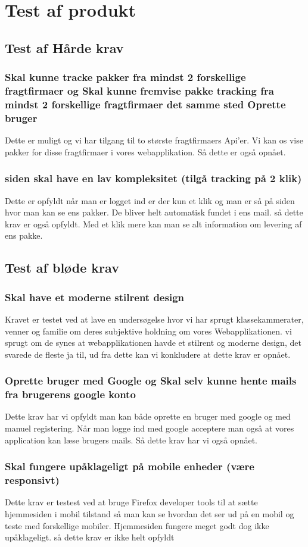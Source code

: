 \chapter{Test af produkt}
\section{Test af Hårde krav}
\subsection*{Skal kunne tracke pakker fra mindst 2 forskellige fragtfirmaer og Skal kunne fremvise pakke tracking fra mindst 2 forskellige fragtfirmaer det samme sted Oprette
bruger}
Dette er muligt og vi har tilgang til to største fragtfirmaers Api'er. Vi kan os vise pakker for disse fragtfirmaer i vores webapplikation. Så dette er også
opnået.
\subsection*{siden skal have en lav kompleksitet (tilgå tracking på 2 klik)}
Dette er opfyldt når man er logget ind er der kun et klik og man er så på siden hvor man kan se 
ens pakker. De bliver helt automatisk fundet i ens mail. så dette krav er også opfyldt. Med et klik mere kan man
se alt information om levering af ens pakke.

\section{Test af bløde krav}
\subsection*{Skal have et moderne stilrent design}
Kravet er testet ved at lave en undersøgelse hvor vi har sprugt klassekammerater, venner og familie om deres
subjektive holdning om vores Webapplikationen. vi sprugt om de synes at webapplikationen havde et stilrent og moderne design,
det svarede de fleste ja til, ud fra dette kan vi konkludere at dette krav er opnået.

\subsection*{Oprette bruger med Google og Skal selv kunne hente mails fra brugerens google konto}

Dette krav har vi opfyldt man kan både oprette en bruger med google og med manuel registering. Når man
logge ind med google acceptere man også at vores application kan læse brugers mails. Så dette krav har vi også opnået. 

\subsection*{Skal fungere upåklageligt på mobile enheder (være responsivt)}

Dette krav er testest ved at bruge Firefox developer tools til at sætte hjemmesiden i mobil 
tilstand så man kan se hvordan det ser ud på en mobil og teste med forskellige mobiler. Hjemmesiden 
fungere meget godt dog ikke upåklageligt. så dette krav er ikke helt opfyldt